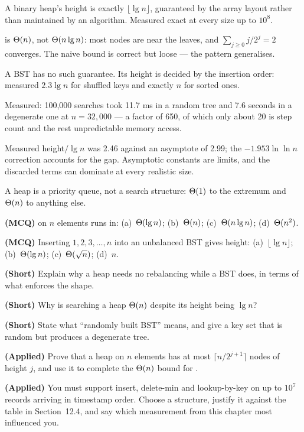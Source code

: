 \begin{chaptersummary}
\begin{tight}
  \item A binary heap's height is exactly $\lfloor \lg n \rfloor$, guaranteed
        by the array layout rather than maintained by an algorithm. Measured
        exact at every size up to $10^{8}$.
  \item {} is $\Theta(n)$, not $\Theta(n\operatorname{lg} n)$: most nodes
        are near the leaves, and $\sum_{j\ge0} j/2^{j} = 2$ converges. The
        naive bound is correct but loose --- the pattern 
        generalises.
  \item A BST has no such guarantee. Its height is decided by the insertion
        order: measured $2.3\lg n$ for shuffled keys and exactly $n$ for sorted
        ones.
  \item Measured: 100{,}000 searches took 11.7 ms in a random tree and 7.6
        seconds in a degenerate one at $n = 32{,}000$ --- a factor of 650,
        of which only about 20 is step count and the rest unpredictable memory
        access.
  \item Measured height$/\lg n$ was 2.46 against an asymptote of 2.99; the
        $-1.953\ln\ln n$ correction accounts for the gap. Asymptotic constants
        are limits, and the discarded terms can dominate at every realistic
        size.
  \item A heap is a priority queue, not a search structure: $\Theta(1)$ to the
        extremum and $\Theta(n)$ to anything else.
\end{tight}
\end{chaptersummary}

\begin{reviewq}
  \item \textbf{(MCQ)}  on $n$ elements runs in:
        (a)~$\Theta(\operatorname{lg} n)$; (b)~$\Theta(n)$; (c)~$\Theta(n\operatorname{lg} n)$;
        (d)~$\Theta(n^{2})$.
  \item \textbf{(MCQ)} Inserting $1,2,3,\ldots,n$ into an unbalanced BST gives
        height: (a)~$\lfloor\lg n\rfloor$; (b)~$\Theta(\operatorname{lg} n)$;
        (c)~$\Theta(\sqrt n)$; (d)~$n$.
  \item \textbf{(Short)} Explain why a heap needs no rebalancing while a BST
        does, in terms of what enforces the shape.
  \item \textbf{(Short)} Why is searching a heap $\Theta(n)$ despite its height
        being $\lg n$?
  \item \textbf{(Short)} State what ``randomly built BST'' means, and give a key
        set that is random but produces a degenerate tree.
  \item \textbf{(Applied)} Prove that a heap on $n$ elements has at most
        $\lceil n/2^{j+1}\rceil$ nodes of height $j$, and use it to complete the
        $\Theta(n)$ bound for .
  \item \textbf{(Applied)} You must support insert, delete-min and lookup-by-key
        on up to $10^{7}$ records arriving in timestamp order. Choose a
        structure, justify it against the table in Section~12.4, and say which
        measurement from this chapter most influenced you.
\end{reviewq}

